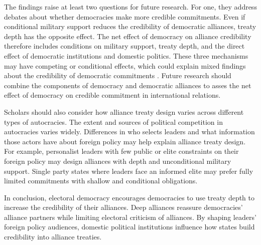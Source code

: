 \documentclass[12pt]{article}
\begin{document}
The findings raise at least two questions for future research.  
For one, they address debates about whether democracies make more credible commitments. 
Even if conditional military support reduces the credibility of democratic alliances, treaty depth has the opposite effect. 
The net effect of democracy on alliance credibility therefore includes conditions on military support, treaty depth, and the direct effect of democratic institutions and domestic politics. 
These three mechanisms may have competing or conditional effects, which could explain mixed findings about the credibility of democratic commitments \citep{Schultz1999, Leeds1999, Thyne2012, DownesSechser2012, PotterBaum2014}.
Future research should combine the components of democracy and democratic alliances to asses the net effect of democracy on credible commitment in international relations. 


Scholars should also consider how alliance treaty design varies across different types of autocracies. 
The extent and sources of political competition in autocracies varies widely. 
Differences in who selects leaders and what information those actors have about foreign policy \citep{Weeks2008} may help explain alliance treaty design.
For example, personalist leaders with few public or elite constraints on their foreign policy may design alliances with depth and unconditional military support. 
Single party states where leaders face an informed elite may prefer fully limited commitments with shallow and conditional obligations. 


In conclusion, electoral democracy encourages democracies to use treaty depth to increase the credibility of their alliances. 
Deep alliances reassure democracies' alliance partners while limiting electoral criticism of alliances. 
By shaping leaders' foreign policy audiences, domestic political institutions influence how states build credibility into alliance treaties.




 
 
\end{document}
